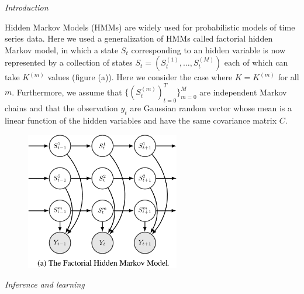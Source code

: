 \documentclass[10pt,a4paper]{report}
\begin{document}
\begin{center}
\end{center}
\vspace{80pt}

\begin{center}
\Huge{\textit{Introduction}}
\end{center}
\vspace{20pt}

\Large{
	
	Hidden Markov Models (HMMs) are widely used for probabilistic models of time series data. Here we used a generalization of HMMs called factorial hidden Markov model, in which a state $S_t$ corresponding to an hidden variable is now represented by a collection of states $S_t = \left(S_t^{(1)},\dots,S_t^{(M)}\right)$ each of which can take $K^{(m)}$ values (figure (a)). Here we consider the case where $K = K^{(m)}$ for all $m$. Furthermore, we assume that $\{(S_t^{(m)})_{t=0}^T\}_{m=0}^M$ are independent Markov chains and that the observation $y_t$ are Gaussian random vector whose mean is a linear function of the hidden variables and have the same covariance matrix $C$.
	\newline
	\newline
	
	}

\begin{figure}[h]
	\centering
	\includegraphics[width=0.6\textwidth]{fHMM.png}
	\label{fig:b}
\end{figure}


\newpage
\begin{center}
\Huge{\textit{Inference and learning}}
\end{center}
\vspace{20pt}
\end{document}
